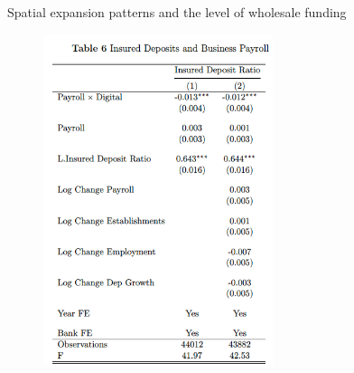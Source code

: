 \documentclass[notes,10pt, aspectratio=169]{beamer}
\begin{document}
\begin{frame}{Spatial expansion patterns and the level of wholesale funding         \hyperlink{mismatch_sorting}{}}
        
            \begin{figure}
                \centering
                \includegraphics[width=0.6\textwidth]{imgs/tab6.png}
                \label{fig:my_label}
            \end{figure}
            
            \end{frame}
        
\end{document}
